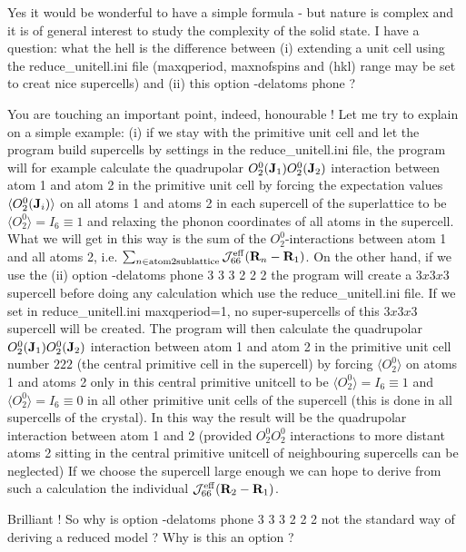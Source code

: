 \begin{description}
\begin{description}
\PP  Yes it would be wonderful to have a simple formula - but nature is complex and it is of 
general interest to study the complexity of the solid state. I have a question:
what the hell is the difference between (i) extending a unit cell using the 
{\prg reduce\_unitell.ini} file ({\prg maxqperiod, maxnofspins} and (hkl) range may be set
to creat nice supercells) and (ii) this option {\prg -delatoms phone } ?

\EE You are touching an important point, indeed, honourable \pp ! Let me try to
explain on a simple example: (i) if we stay with the primitive unit cell and
let the program build supercells by settings in the {\prg reduce\_unitell.ini } file,
the program will for example calculate the quadrupolar $O_2^0(\mathbf J_1)O_2^0(\mathbf J_2)$ interaction between
atom 1 and atom 2 in the primitive unit cell by forcing 
the expectation values $\langle O_2^0(\mathbf J_i) \rangle$ on all atoms 1 and atoms 2
in each supercell of the superlattice to be  $\langle O_2^0 \rangle=I_6\equiv 1$ and
 relaxing the phonon coordinates
of all atoms in the supercell. What we will get in this way is
the sum of the $O_2^0$-interactions between atom 1 and all atoms 2, i.e.
$\sum_{n\in {\rm atom 2 sublattice}} \mathcal J^{\rm eff}_{66}(\mathbf R_n-\mathbf R_{1})$.
 On the other hand, if we use the (ii) option {\prg -delatoms phone 3 3 3 2 2 2}
the program will create a $3x3x3$ supercell before doing any calculation which
use the {\prg reduce\_unitell.ini} file. If we set in {\prg reduce\_unitell.ini} 
{\prg maxqperiod=1}, no super-supercells of this $3x3x3$ supercell will be created.
The program will then  calculate the quadrupolar $O_2^0(\mathbf J_1)O_2^0(\mathbf J_2)$ interaction between
atom 1 and atom 2 in the primitive unit cell number $2 2 2$ (the central primitive cell in
the supercell) by forcing $\langle O_2^0 \rangle$ on atoms 1 and atoms 2
only in this central primitive unitcell to be  $\langle O_2^0 \rangle=I_6\equiv 1$ and 
$\langle O_2^0 \rangle=I_6\equiv 0$ in all other primitive unit cells of the supercell
 (this is done in all supercells of the crystal).
In this way the result will be the quadrupolar interaction between
atom 1 and 2 (provided $O_2^0 O_2^0$ interactions to more distant atoms 2 sitting in
the central primitive unitcell of neighbouring supercells can be neglected)
 If we choose the supercell large enough
we can hope to derive from such a calculation the individual $\mathcal J^{\rm eff}_{66}(\mathbf R_2-\mathbf R_{1})$.

\OO Brilliant ! So why is option {\prg -delatoms phone 3 3 3 2 2 2} not the standard way
of deriving a reduced model ? Why is this an option ?


\end{description}
\end{description}
